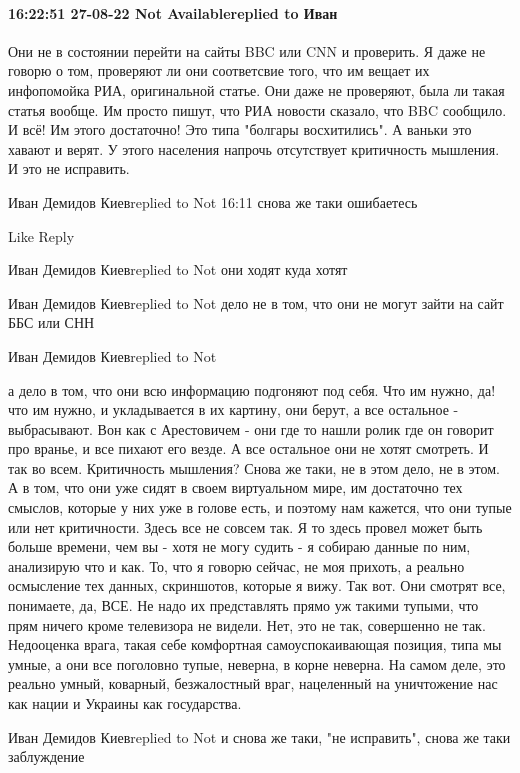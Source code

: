  
 
 
 
 

\paragraph{16:22:51 27-08-22 Not Availablereplied to Иван}

Они не в состоянии перейти на сайты BBC или CNN и проверить. Я даже не говорю о
том, проверяют ли они соответсвие того, что им вещает их инфопомойка РИА,
оригинальной статье. Они даже не проверяют, была ли такая статья вообще. Им
просто пишут, что РИА новости сказало, что BBC сообщило. И всё! Им этого
достаточно! Это типа "болгары восхитились". А ваньки это хавают и верят. У
этого населения напрочь отсутствует критичность мышления. И это не исправить.


Иван Демидов Киевreplied to Not
16:11
снова же таки ошибаетесь

    Like
    Reply

Иван Демидов Киевreplied to Not
они ходят куда хотят

Иван Демидов Киевreplied to Not
дело не в том, что они не могут зайти на сайт ББС или СНН

Иван Демидов Киевreplied to Not

а дело в том, что они всю информацию подгоняют под себя. Что им нужно, да! что
им нужно, и укладывается в их картину, они берут, а все остальное -
выбрасывают. Вон как с Арестовичем - они где то нашли ролик где он говорит про
вранье, и все пихают его везде. А все остальное они не хотят смотреть. И так во
всем. Критичность мышления? Снова же таки, не в этом дело, не в этом. А в том,
что они уже сидят в своем виртуальном мире, им достаточно тех смыслов, которые
у них уже в голове есть, и поэтому нам кажется, что они тупые или нет
критичности. Здесь все не совсем так. Я то здесь провел может быть больше
времени, чем вы - хотя не могу судить - я собираю данные по ним, анализирую что
и как. То, что я говорю сейчас, не моя прихоть, а реально осмысление тех
данных, скриншотов, которые я вижу. Так вот. Они смотрят все, понимаете, да,
ВСЕ. Не надо их представлять прямо уж такими тупыми, что прям ничего кроме
телевизора не видели. Нет, это не так, совершенно не так. Недооценка врага,
такая себе комфортная самоуспокаивающая позиция, типа мы умные, а они все
поголовно тупые, неверна, в корне неверна. На самом деле, это реально умный,
коварный, безжалостный враг, нацеленный на уничтожение нас как нации и Украины
как государства.

Иван Демидов Киевreplied to Not
и снова же таки, "не исправить", снова же таки заблуждение
